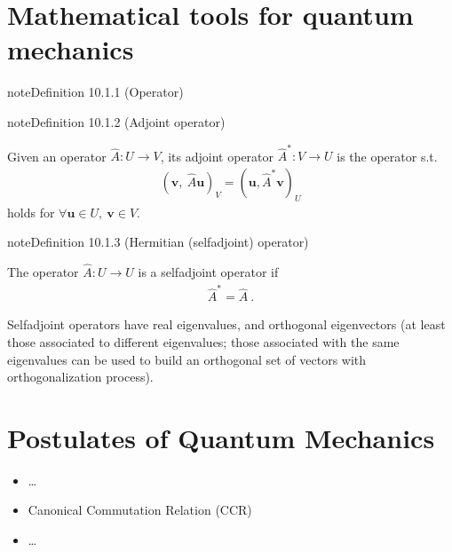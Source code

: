 \documentclass[letterpaper,10pt,english]{jupyterBook}
\begin{document}
\section{Mathematical tools for quantum mechanics}
\label{\detokenize{ch/quantum-mechanics/intro:mathematical-tools-for-quantum-mechanics}}\label{ch/quantum-mechanics/intro:Operator}
\begin{sphinxadmonition}{note}{Definition 10.1.1 (Operator)}


\end{sphinxadmonition}
\label{ch/quantum-mechanics/intro:Adjoint Operator}
\begin{sphinxadmonition}{note}{Definition 10.1.2 (Adjoint operator)}



\sphinxAtStartPar
Given an operator \(\hat{A}: U \rightarrow V\), its adjoint operator \(\hat{A}^*: V \rightarrow U\) is the operator s.t.
\begin{equation*}
\begin{split}(\mathbf{v}, \ \hat{A} \mathbf{u})_{V} = (\mathbf{u}, \hat{A}^* \mathbf{v} )_{U}\end{split}
\end{equation*}
\sphinxAtStartPar
holds for \(\forall \mathbf{u} \in U, \ \mathbf{v} \in V\).
\end{sphinxadmonition}
\label{ch/quantum-mechanics/intro:Self-Adjoint Operator}
\begin{sphinxadmonition}{note}{Definition 10.1.3 (Hermitian (self\sphinxhyphen{}adjoint) operator)}



\sphinxAtStartPar
The operator \(\hat{A}: U \rightarrow U\) is a self\sphinxhyphen{}adjoint operator if
\begin{equation*}
\begin{split}\hat{A}^* = \hat{A} \ .\end{split}
\end{equation*}\end{sphinxadmonition}

\sphinxAtStartPar
Self\sphinxhyphen{}adjoint operators have real eigenvalues, and orthogonal eigenvectors (at least those associated to different eigenvalues; those associated with the same eigenvalues can be used to build an orthogonal set of vectors with orthogonalization process).


\section{Postulates of Quantum Mechanics}
\label{\detokenize{ch/quantum-mechanics/intro:postulates-of-quantum-mechanics}}\begin{itemize}
\item {} 
\sphinxAtStartPar
…

\item {} 
\sphinxAtStartPar
Canonical Commutation Relation (CCR) 

\item {} 
\sphinxAtStartPar
…

\end{itemize}
\end{document}
